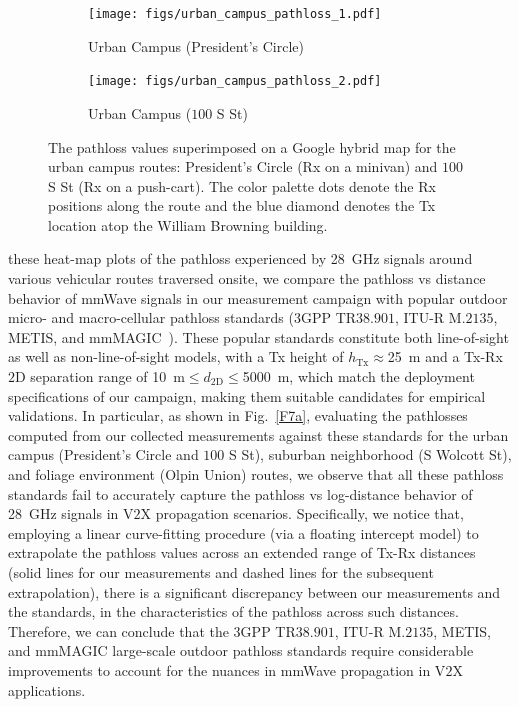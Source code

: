 \documentclass[10pt, twocolumn]{IEEEtran}
\begin{document}
{\begin{figure} [t]
\begin{subfigure}{0.564\linewidth}
        \centering
        \texttt{[image: figs/urban\_campus\_pathloss\_1.pdf]}
        \caption{Urban Campus (President's Circle)}
        \label{F5a}
    \end{subfigure}
    \begin{subfigure}{0.426\linewidth}
        \centering
        \texttt{[image: figs/urban\_campus\_pathloss\_2.pdf]}
        \caption{Urban Campus ($100$ S St)}
        \label{F5b}
    \end{subfigure}
    \vspace{-5mm}
    \caption{The pathloss values superimposed on a Google hybrid map for the urban campus routes: President's Circle (Rx on a minivan) and $100$ S St (Rx on a push-cart). The color palette dots denote the Rx positions along the route and the blue diamond denotes the Tx location atop the William Browning building.}
    \vspace{-3mm}
    \label{F5}
\end{figure}
 these heat-map plots of the pathloss experienced by \SI{28}{\giga\hertz} signals around various vehicular routes traversed onsite, we compare the pathloss vs distance behavior of mmWave signals in our measurement campaign with popular outdoor micro- and macro-cellular pathloss standards ($3$GPP TR$38.901$, ITU-R M$.2135$, METIS, and mmMAGIC~\cite{MacCartneyModelsOverview}). These popular standards constitute both line-of-sight as well as non-line-of-sight models, with a Tx height of $h_{\text{Tx}}{\approx}$\SI{25}{\meter} and a Tx-Rx $2$D separation range of \SI{10}{\meter}${\leq}d_{2\text{D}}{\leq}$\SI{5000}{\meter}, which match the deployment specifications of our campaign, making them suitable candidates for empirical validations. In particular, as shown in Fig.~\ref{F7a}, evaluating the pathlosses computed from our collected measurements against these standards for the urban campus (President's Circle and $100$ S St), suburban neighborhood (S Wolcott St), and foliage environment (Olpin Union) routes, we observe that all these pathloss standards fail to accurately capture the pathloss vs log-distance behavior of \SI{28}{\giga\hertz} signals in V$2$X propagation scenarios. Specifically, we notice that, employing a linear curve-fitting procedure (via a floating intercept model) to extrapolate the pathloss values across an extended range of Tx-Rx distances (solid lines for our measurements and dashed lines for the subsequent extrapolation), there is a significant discrepancy between our measurements and the standards, in the characteristics of the pathloss across such distances. Therefore, we can conclude that the $3$GPP TR$38.901$, ITU-R M$.2135$, METIS, and mmMAGIC large-scale outdoor pathloss standards require considerable improvements to account for the nuances in mmWave propagation in V$2$X applications.
}
\end{document}
